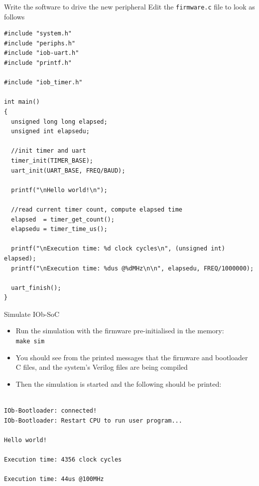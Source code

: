 \documentclass [xcolor=svgnames, t] {beamer}
\begin{document}
\begin{frame}[fragile]{Write the software to drive the new peripheral}
  Edit the {\tt firmware.c} file to look as follows
  \begin{tiny}
    \begin{lstlisting}
#include "system.h"
#include "periphs.h"
#include "iob-uart.h"
#include "printf.h"
      
#include "iob_timer.h"

int main()
{
  unsigned long long elapsed;
  unsigned int elapsedu;

  //init timer and uart
  timer_init(TIMER_BASE);
  uart_init(UART_BASE, FREQ/BAUD);

  printf("\nHello world!\n");

  //read current timer count, compute elapsed time
  elapsed  = timer_get_count();
  elapsedu = timer_time_us();

  printf("\nExecution time: %d clock cycles\n", (unsigned int) elapsed);
  printf("\nExecution time: %dus @%dMHz\n\n", elapsedu, FREQ/1000000);

  uart_finish();
}
    \end{lstlisting}
  \end{tiny}
\end{frame}


\begin{frame}[fragile]{Simulate IOb-SoC}
\begin{itemize}
\item Run the simulation with the firmware pre-initialised in the memory:\\
  {\tt make sim}
\item You should see from the printed messages that the firmware and bootloader C files, and the system's Verilog files are being compiled
\item Then the simulation is started and the following should be printed:
\end{itemize}

\begin{tiny}
  \begin{lstlisting}

IOb-Bootloader: connected!
IOb-Bootloader: Restart CPU to run user program...

Hello world!

Execution time: 4356 clock cycles

Execution time: 44us @100MHz

  \end{lstlisting}
\end{tiny}
\end{frame}
\end{document}

